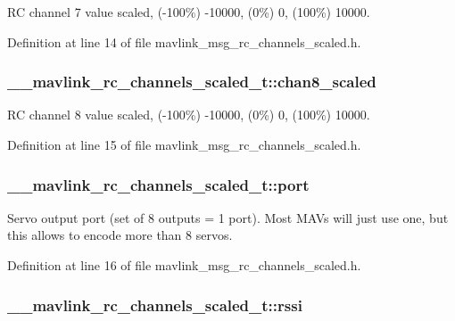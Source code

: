 R\-C channel 7 value scaled, (-\/100\%) -\/10000, (0\%) 0, (100\%) 10000. 



Definition at line 14 of file mavlink\-\_\-msg\-\_\-rc\-\_\-channels\-\_\-scaled.\-h.

\hypertarget{struct____mavlink__rc__channels__scaled__t_a53c6f6016f7f9e8a93ed1b1b959e1de7}{
\subsubsection[{chan8\-\_\-scaled}]{ \-\_\-\-\_\-mavlink\-\_\-rc\-\_\-channels\-\_\-scaled\-\_\-t\-::chan8\-\_\-scaled}}\label{struct____mavlink__rc__channels__scaled__t_a53c6f6016f7f9e8a93ed1b1b959e1de7}


R\-C channel 8 value scaled, (-\/100\%) -\/10000, (0\%) 0, (100\%) 10000. 



Definition at line 15 of file mavlink\-\_\-msg\-\_\-rc\-\_\-channels\-\_\-scaled.\-h.

\hypertarget{struct____mavlink__rc__channels__scaled__t_a8781afa3337e7a7e4b88b66569dcdf5a}{
\subsubsection[{port}]{ \-\_\-\-\_\-mavlink\-\_\-rc\-\_\-channels\-\_\-scaled\-\_\-t\-::port}}\label{struct____mavlink__rc__channels__scaled__t_a8781afa3337e7a7e4b88b66569dcdf5a}


Servo output port (set of 8 outputs = 1 port). Most M\-A\-Vs will just use one, but this allows to encode more than 8 servos. 



Definition at line 16 of file mavlink\-\_\-msg\-\_\-rc\-\_\-channels\-\_\-scaled.\-h.

\hypertarget{struct____mavlink__rc__channels__scaled__t_a06ada0758b5f85258d48fd19ebe7a5bd}{
\subsubsection[{rssi}]{ \-\_\-\-\_\-mavlink\-\_\-rc\-\_\-channels\-\_\-scaled\-\_\-t\-::rssi}}\label{struct____mavlink__rc__channels__scaled__t_a06ada0758b5f85258d48fd19ebe7a5bd}


